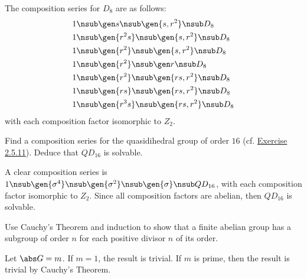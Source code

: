 \begin{problems}
\begin{sol}
        The composition series for $D_8$ are as follows:
        \begin{align*}
            1 & \nsub \gen s \nsub \gen{s, r^2} \nsub D_8 \\
            1 & \nsub \gen{r^2s} \nsub \gen{s, r^2} \nsub D_8 \\
            1 & \nsub \gen{r^2} \nsub \gen{s, r^2} \nsub D_8 \\
            1 & \nsub \gen{r^2} \nsub \gen r \nsub D_8 \\
            1 & \nsub \gen{r^2} \nsub \gen{rs, r^2} \nsub D_8 \\
            1 & \nsub \gen{rs} \nsub \gen{rs, r^2} \nsub D_8 \\
            1 & \nsub \gen{r^3s} \nsub \gen{rs, r^2} \nsub D_8
        \end{align*}
        with each composition factor isomorphic to $Z_2$.
    \end{sol}
    \item Find a composition series for the quasidihedral group of order $16$
    (cf. \hyperref[ex2.5.11]{Exercise 2.5.11}). Deduce that $QD_{16}$ is solvable.
    \begin{sol}
        A clear composition series is $1 \nsub \gen{\sigma^4} \nsub \gen{\sigma^2} \nsub \gen{\sigma} \nsub QD_{16}$, with each composition factor isomorphic to $Z_2$. Since all composition factors are abelian, then $QD_{16}$ is solvable.
    \end{sol}
    \item Use Cauchy's Theorem and induction to show that a finite abelian group has a subgroup of order $n$ for each positive divisor $n$ of its order.
    \begin{sol}
        Let $\abs G = m$. If $m = 1$, the result is trivial. If $m$ is prime, then the result is trivial by Cauchy's Theorem.


\end{sol}
\end{problems}
